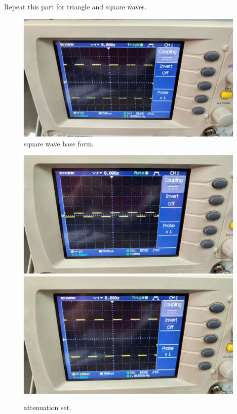 \documentclass[11pt]{article}
\newcommand{\PicScale}{0.2}
\begin{document}
\begin{question}
\begin{subquestion}{Repeat this part for triangle and square waves.}
{            \begin{figure}[H]
                \begin{center}
                    \includegraphics[scale=\PicScale]{Fig/13.jpeg}
                    \caption{square wave base form.}
                \end{center}
            \end{figure}

            \begin{figure}[H]
                \begin{center}
                    \includegraphics[scale=0.1]{Fig/14.jpeg}
                    \includegraphics[scale=0.1]{Fig/15.jpeg}
                    \caption{attenuation set.}
                \end{center}
            \end{figure}

}
\end{subquestion}
\end{question}
\end{document}
